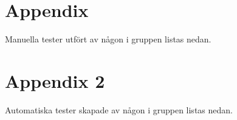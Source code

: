 \documentclass[10pt]{article}
\begin{document}
\pagebreak
\setlength{\parindent}{0pt}
\section{Appendix}
Manuella tester utfört av någon i gruppen listas nedan.

\section{Appendix 2}
\label{sec:test_scoreboard}
 
\vspace{5mm}
\label{sec:test_spelkontroll}
 
\vspace{5mm}
\label{sec:controller_disconnect}
 
\vspace{5mm}
\label{sec:controller_new_session}
 
\vspace{5mm}
\label{sec:controller_update_playercount}
 
\vspace{5mm}
\label{sec:controller_view_session}
 
\vspace{5mm}
\label{sec:controller_view_started}
 
\vspace{5mm}
\label{sec:ui_connect}
 
\vspace{5mm}

\pagebreak
Automatiska tester skapade av någon i gruppen listas nedan.
\pagebreak

\printbibliography	
	
\end{document}
